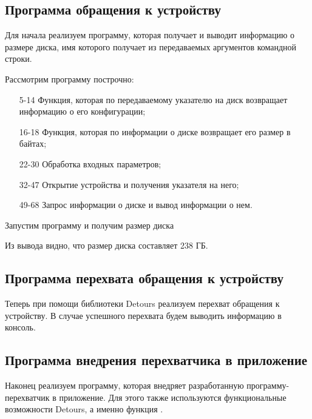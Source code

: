 \subsection{Программа обращения к устройству}

Для начала реализуем программу, которая получает и выводит информацию о размере диска, имя которого получает из передаваемых аргументов командной строки.



Рассмотрим программу построчно:
\begin{itemize}
	\item [5-14] Функция, которая по передаваемому указателю на диск возвращает информацию о его конфигурации;
	\item [16-18] Функция, которая по информации о диске возвращает его размер в байтах;
	\item [22-30] Обработка входных параметров;
	\item [32-47] Открытие устройства и получения указателя на него;
	\item [49-68] Запрос информации о диске и вывод информации о нем.
\end{itemize}

Запустим программу и получим размер диска 



Из вывода видно, что размер диска составляет 238 ГБ.

\subsection{Программа перехвата обращения к устройству}

Теперь при помощи библиотеки Detours реализуем перехват обращения к устройству. В случае успешного перехвата будем выводить информацию в консоль.





\subsection{Программа внедрения перехватчика в приложение}

Наконец реализуем программу, которая внедряет разработанную программу-перехватчик в приложение. Для этого также используются функциональные возможности Detours, а именно функция .

